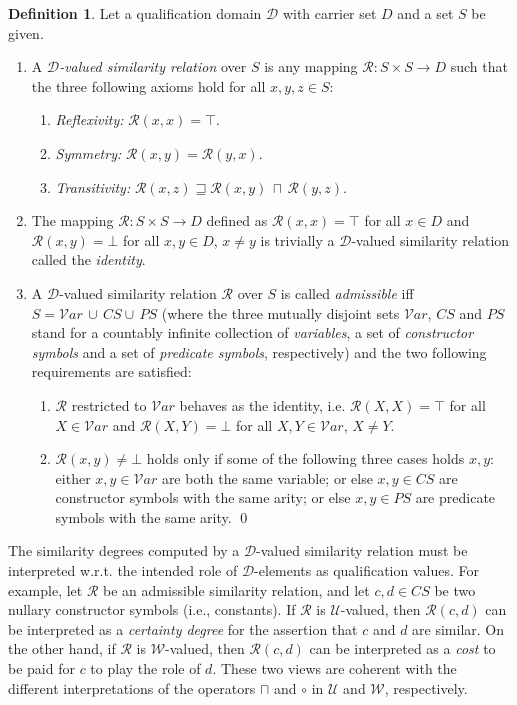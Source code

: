 \documentclass{sigplanconf}
\newcommand{\qdom}{\mathcal{D}} \newcommand{\dqdom}{D \setminus \{\bot\}} \newcommand{\bqdom}{(D \setminus \{\bot\}) \uplus \{?\}}
\newcommand{\U}{\mathcal{U}}
\newcommand{\W}{\mathcal{W}}
\newcommand{\simrel}{\mathcal{R}}
\newcommand{\Prog}{\mathcal{P}} \newcommand{\UProg}{\mathcal{P_U}}
\newcommand{\Var}{\mathcal V\!ar} \newcommand{\War}{\mathcal W\!ar} \newcommand{\elemset}[2]{\mathrm{#1}(#2)} \newcommand{\varset}[1]{\elemset{var}{#1}} \newcommand{\warset}[1]{\elemset{war}{#1}} \newcommand{\domset}[1]{\elemset{dom}{#1}} \newcommand{\Tp}{\mathrm{T}_{\Prog}} \newcommand{\Tpd}{\mathrm{T}_{\Prog,\qdom}} \newcommand{\Mp}{\mathcal{M}_{\Prog}} \newcommand{\M}[1]{\mathcal{M}_{#1}} \newcommand{\Atz}{\mathrm{At}_{\Sigma}} \newcommand{\QAtz}{\mathrm{At}_{\Sigma}(\qdom)} \newcommand{\intd}{\mathrm{Int}_{\Sigma}(\qdom)} \newcommand{\intrd}{\mathrm{Int}_{\Sigma}(\simrel,\qdom)} \newcommand{\sust}{\mathrm{Subst}_{\Sigma}} \newcommand{\sustd}{\sust(\qdom)} \newcommand{\I}{\mathcal{I}} \newcommand{\J}{\mathcal{J}} \newcommand{\at}[2]{#1\,\sharp\,#2} \newcommand{\ats}[1]{\overline{#1}} \newcommand{\qgets}[1]{\gets\!#1\!-} \newcommand{\sep}{~{\talloblong}~} \newcommand{\true}{\texttt{tt}} \newcommand{\false}{\texttt{ff}} \newcommand{\linear}[1]{#1_\ell}
\theoremstyle{definition}
\newtheorem{definition}{Definition}
\theoremstyle{plain}
\begin{document}
\begin{definition} \label{defSR} Let a qualification domain $\qdom$ with carrier set $D$ and a set $S$ be given.
\begin{enumerate}
\item A {\em $\qdom$-valued similarity relation} over $S$ is any mapping  $\simrel : S \times S \to D$ such that the three following axioms hold for all $x,y,z \in S$:
    \begin{enumerate}
        \item {\em Reflexivity:} $\simrel(x,x) = \top$.
        \item {\em Symmetry:} $\simrel(x,y) = \simrel(y,x)$.
        \item {\em Transitivity:} $\simrel(x,z) \sqsupseteq \simrel(x,y)\, \sqcap\, \simrel(y,z)$.
    \end{enumerate}
\item The mapping $\simrel : S \times S \to D$ defined as $\simrel(x,x) = \top$ for all $x \in D$ and $\simrel(x,y) = \bot$ for all $x,y \in D$, $x \neq y$ is trivially a $\qdom$-valued similarity relation called the \emph{identity}.
\item A $\qdom$-valued similarity relation $\simrel$ over $S$ is called {\em admissible} iff $S = \Var\, \cup\, CS \cup\, PS$ (where the three mutually disjoint sets $\Var$, $CS$ and $PS$ stand for a countably infinite collection of {\em variables}, a set of {\em constructor symbols} and a set of {\em predicate symbols}, respectively) and the two following requirements are satisfied:
    \begin{enumerate}
        \item $\simrel$ restricted to $\Var$ behaves as the identity, i.e. $\simrel(X,X) = \top$ for all $X \in \Var$ and $\simrel(X,Y) = \bot$ for all $X, Y \in \Var$, $X \neq Y$.
        \item $\simrel(x,y) \neq \bot$ holds only if some of the following three cases holds $x, y$: either $x, y \in \Var$ are both the same variable; or else $x, y \in CS$ are constructor symbols with the same arity; or else $x, y \in PS$ are predicate  symbols with the same arity. \qed
    \end{enumerate}
\end{enumerate}
\end{definition}

The similarity degrees computed by a $\qdom$-valued similarity relation must be interpreted w.r.t. the intended role of $\qdom$-elements as qualification values. For example, let  $\simrel$ be an admissible similarity relation, and let $c, d \in CS$ be two nullary constructor symbols (i.e., constants). If $\simrel$ is $\U$-valued, then $\simrel(c,d)$ can be interpreted as a {\em certainty degree} for the assertion that $c$ and $d$ are similar. On the other hand, if $\simrel$ is $\W$-valued, then $\simrel(c,d)$ can be interpreted as a {\em cost} to be paid for $c$ to play the role of $d$. These two views are coherent with the different interpretations of the operators $\sqcap$ and $\circ$ in $\U$ and $\W$, respectively.
\end{document}
